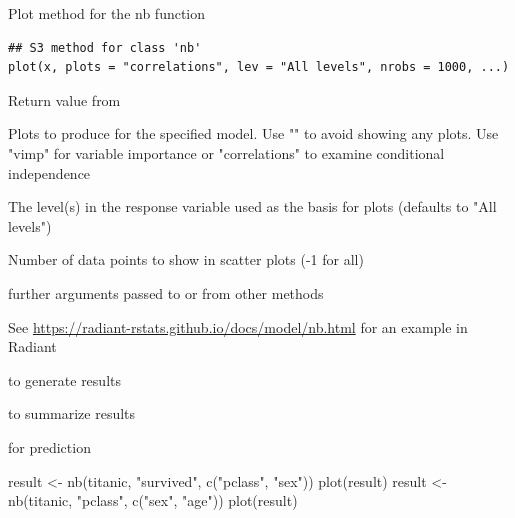 \documentclass[a4paper]{book}
\begin{document}
%
\begin{Description}
Plot method for the nb function
\end{Description}
%
\begin{Usage}
\begin{verbatim}
## S3 method for class 'nb'
plot(x, plots = "correlations", lev = "All levels", nrobs = 1000, ...)
\end{verbatim}
\end{Usage}
%
\begin{Arguments}
\begin{ldescription}
\item[\code{x}] Return value from 

\item[\code{plots}] Plots to produce for the specified model. Use "" to avoid showing any plots. Use "vimp" for variable importance or "correlations" to examine conditional independence

\item[\code{lev}] The level(s) in the response variable used as the basis for plots (defaults to "All levels")

\item[\code{nrobs}] Number of data points to show in scatter plots (-1 for all)

\item[\code{...}] further arguments passed to or from other methods
\end{ldescription}
\end{Arguments}
%
\begin{Details}
See \url{https://radiant-rstats.github.io/docs/model/nb.html} for an example in Radiant
\end{Details}
%
\begin{SeeAlso}
 to generate results

 to summarize results

 for prediction
\end{SeeAlso}
%
\begin{Examples}
\begin{ExampleCode}
result <- nb(titanic, "survived", c("pclass", "sex"))
plot(result)
result <- nb(titanic, "pclass", c("sex", "age"))
plot(result)

\end{ExampleCode}
\end{Examples}
\end{document}
